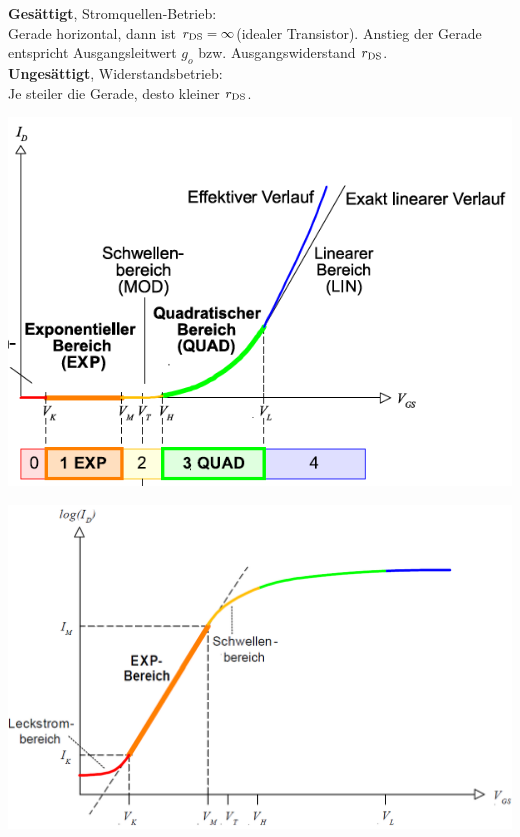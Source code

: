 \begin{minipage}{0.5\linewidth}
\textbf{Gesättigt}, Stromquellen-Betrieb:\\
Gerade horizontal, dann ist $r_{\rm DS} = \infty$(idealer Transistor). Anstieg der Gerade entspricht Ausgangsleitwert $g_o$ bzw. Ausgangswiderstand $r_{\rm DS}$.\\
\textbf{Ungesättigt}, Widerstandsbetrieb:\\
Je steiler die Gerade, desto kleiner $r_{\rm DS}$.
\end{minipage}
\begin{minipage}{0.33\linewidth}
\includegraphics[width=1\linewidth]{Transferkennline.png}
\end{minipage}%
\begin{minipage}{0.33\linewidth}
\includegraphics[width=1\linewidth]{Transferkennline_Log.png}
\end{minipage}%
